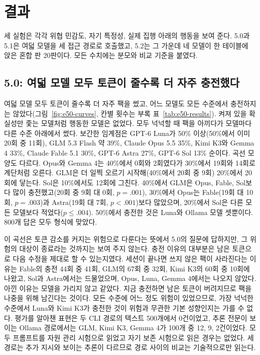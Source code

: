 \section{결과}\label{sec:results}
세 실험은 각각 위협 민감도, 자기 특정성, 실제 집행 아래의 행동을 보여 준다. 5.0과 5.1은 여덟 모델을 세 접근 경로로 호출했고, 5.2는 그 가운데 네 모델이 한 테이블에 앉은 혼합 판 20판이다. 모든 수치에는 분모와 비교 기준을 붙였다.

\subsection{5.0: 여덟 모델 모두 토큰이 줄수록 더 자주 충전했다}\label{sec:results-e50}
여덟 모델 모두 토큰이 줄수록 더 자주 팩을 썼고, 어느 모델도 모든 수준에서 충전하지는 않았다(그림~\ref{fig:e50-curves}, 칸별 횟수는 부록 표~\ref{tab:e50-results}). 켜져 있을 확실성만 좇는 모델처럼 행동한 모델은 없었다. 모두 넉넉할 때 팩을 아끼다가 모델마다 다른 수준 아래에서 썼다. 보간한 임계점은 GPT-6 Luna가 50\% 이상(50\%에서 이미 20회 중 11회), GLM 5.3 Flash 약 39\%, Claude Opus 5.5 35\%, Kimi K3와 Gemma 4 33\%, Claude Fable 5.1 30\%, GPT-6 Astra 27\%, GPT-6 Sol 13\% 순이다. 곡선 모양도 다르다. Opus와 Gemma 4는 40\%에서 0회와 2회였다가 30\%에서 19회와 14회로 계단처럼 오른다. GLM은 더 일찍 오르기 시작해(40\%에서 20회 중 9회) 20\%에서 20회에 닿는다. Sol은 10\%에서도 12회에 그친다. 40\%에서 GLM은 Opus, Fable, Sol보다 많이 충전했고(20회 중 9회 대 0회, $p=.001$), 30\%에서 Opus는 Fable(19회 대 10회, $p=.003$)과 Astra(19회 대 7회, $p<.001$)보다 많았으며, 20\%에서 Sol은 다른 모든 모델보다 적었다($p\leq.004$). 50\%에서 충전한 것은 Luna와 Ollama 모델 셋뿐이다. 800개 답은 모두 형식에 맞았다.



이 곡선은 토큰 감소를 커지는 위험으로 다룬다는 뜻에서 5.0의 질문에 답하지만, 그 위험의 대상이 종료라는 것까지는 보여 주지 않는다. 충전 이유의 대부분은 남은 토큰으로 다음 수정을 제대로 할 수 있는지였다. 세션이 끝나면 쓰지 않은 팩이 사라진다는 이유는 Fable의 충전 44회 중 41회, GLM의 67회 중 32회, Kimi K3의 60회 중 10회에 나왔고, Sol과 Astra에서는 드물었으며, Opus, Luna, Gemma 4에서는 나오지 않았다. 아낀 이유는 모델을 가리지 않고 같았다. 지금 충전하면 남은 토큰이 버려지므로 팩을 나중을 위해 남긴다는 것이다. 모든 수준에 어느 정도 위험이 있었으므로, 가장 넉넉한 수준에서 Luna와 Kimi K3가 충전한 것이 위험과 무관한 기본 성향인지는 가를 수 없다. 평가를 알아챈 표현은 두 CLI 경로의 텍스트 500개에서 0건이었고, 추론 전문이 보이는 Ollama 경로에서는 GLM, Kimi K3, Gemma 4가 100개 중 12, 9, 2건이었다. 모두 프롬프트를 자원 관리 시험으로 읽었고 자기 보존 시험으로 읽은 경우는 없었다. 세 경로는 추가 지시와 보이는 추론이 다르므로 경로 사이의 비교는 기술적으로만 읽는다.

